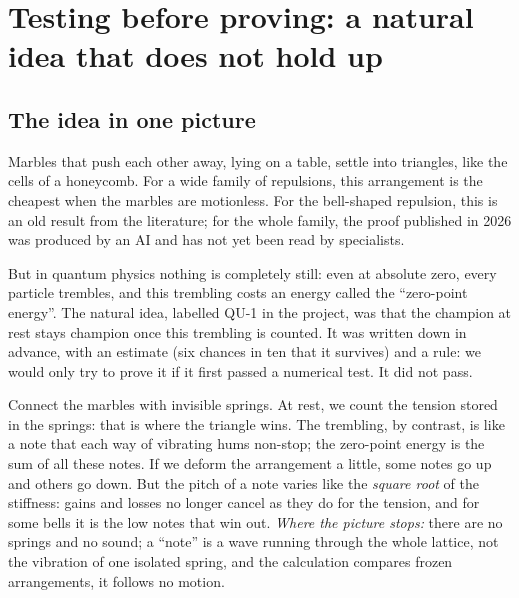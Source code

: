 \chapter[Testing before proving]{Testing before proving: a natural idea that does not hold up}


\section*{The idea in one picture}

Marbles that push each other away, lying on a table, settle into triangles, like the cells of a
honeycomb. For a wide family of repulsions, this arrangement is the cheapest when the marbles
are motionless. For the bell-shaped repulsion, this is an old result from the literature; for
the whole family, the proof published in 2026 was produced by an AI and has not yet been read by
specialists.

But in quantum physics nothing is completely still: even at absolute zero, every particle
trembles, and this trembling costs an energy called the ``zero-point energy''. The natural idea,
labelled QU-1 in the project, was that the champion at rest stays champion once this trembling
is counted. It was written down in advance, with an estimate (six chances in ten that it
survives) and a rule: we would only try to prove it if it first passed a numerical test. It did
not pass.

\begin{analogie}
Connect the marbles with invisible springs. At rest, we count the tension stored in the springs:
that is where the triangle wins. The trembling, by contrast, is like a note that each way of
vibrating hums non-stop; the zero-point energy is the sum of all these notes. If we deform the
arrangement a little, some notes go up and others go down. But the pitch of a note varies like
the \emph{square root} of the stiffness: gains and losses no longer cancel as they do for the
tension, and for some bells it is the low notes that win out.
\emph{Where the picture stops:} there are no springs and no sound; a ``note'' is a wave running
through the whole lattice, not the vibration of one isolated spring, and the calculation
compares frozen arrangements, it follows no motion.
\end{analogie}

